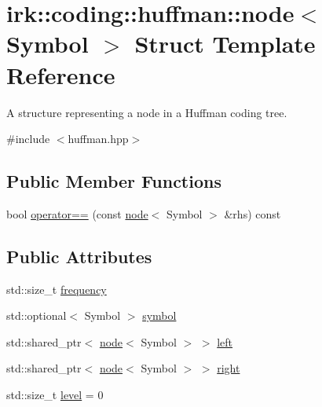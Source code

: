 \hypertarget{structirk_1_1coding_1_1huffman_1_1node}{}\section{irk\+:\+:coding\+:\+:huffman\+:\+:node$<$ Symbol $>$ Struct Template Reference}
\label{structirk_1_1coding_1_1huffman_1_1node}


A structure representing a node in a Huffman coding tree.  




{\ttfamily \#include $<$huffman.\+hpp$>$}

\subsection*{Public Member Functions}
\begin{DoxyCompactItemize}
\item 
bool \mbox{\hyperlink{structirk_1_1coding_1_1huffman_1_1node_a4e0666381a95883e54e9a952aefd3a31}{operator==}} (const \mbox{\hyperlink{structirk_1_1coding_1_1huffman_1_1node}{node}}$<$ Symbol $>$ \&rhs) const
\end{DoxyCompactItemize}
\subsection*{Public Attributes}
\begin{DoxyCompactItemize}
\item 
std\+::size\+\_\+t \mbox{\hyperlink{structirk_1_1coding_1_1huffman_1_1node_ae303f67bca534f5fcbf2a64a586cd7a9}{frequency}}
\item 
std\+::optional$<$ Symbol $>$ \mbox{\hyperlink{structirk_1_1coding_1_1huffman_1_1node_a5506528b3c23fa2187b767a90ca3bfcc}{symbol}}
\item 
std\+::shared\+\_\+ptr$<$ \mbox{\hyperlink{structirk_1_1coding_1_1huffman_1_1node}{node}}$<$ Symbol $>$ $>$ \mbox{\hyperlink{structirk_1_1coding_1_1huffman_1_1node_ac4303bd6570125c1d18506a8596f3b8f}{left}}
\item 
std\+::shared\+\_\+ptr$<$ \mbox{\hyperlink{structirk_1_1coding_1_1huffman_1_1node}{node}}$<$ Symbol $>$ $>$ \mbox{\hyperlink{structirk_1_1coding_1_1huffman_1_1node_addc238c8601bb721a25a5750f6c33ebd}{right}}
\item 
std\+::size\+\_\+t \mbox{\hyperlink{structirk_1_1coding_1_1huffman_1_1node_ae34639865753731eb74aaae1244442e7}{level}} = 0
\end{DoxyCompactItemize}


